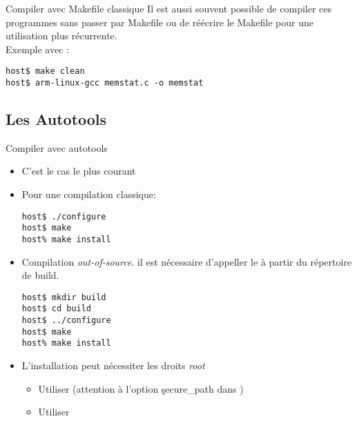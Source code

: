\begin{frame}[fragile=singleslide]{Compiler avec Makefile classique}
  Il est aussi souvent possible de compiler ces programmes sans passer
  par Makefile  ou de réécrire  le Makefile pour une  utilisation plus
  récurrente.
  \\[2ex]
  Exemple avec :
\begin{lstlisting}
host$ make clean
host$ arm-linux-gcc memstat.c -o memstat
\end{lstlisting} %
\end{frame}

\subsection{Les Autotools}

\begin{frame}[fragile=singleslide]{Compiler avec autotools}
  \begin{itemize}
  \item C'est le cas le plus courant
  \item Pour une compilation classique:
    \begin{lstlisting}
host$ ./configure
host$ make
host% make install
    \end{lstlisting} %
  \item Compilation \emph{out-of-source}. il est nécessaire d'appeller
    le  à partir du répertoire de build.
    \begin{lstlisting}
host$ mkdir build
host$ cd build
host$ ../configure
host$ make
host% make install
    \end{lstlisting} %
  \item L'installation peut nécessiter les droits \emph{root}
    \begin{itemize} 
    \item Utiliser  (attention à l'option \c{secure_path}
      dans )
    \item Utiliser 
    \end{itemize} 
  \end{itemize}
\end{frame}

